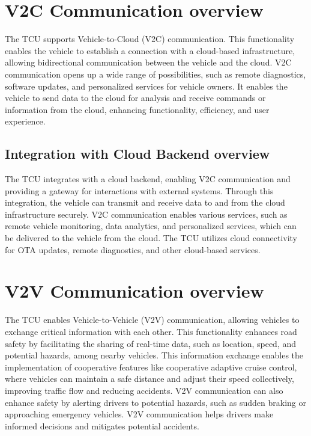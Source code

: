 \documentclass[
12pt,
oneside, 
onehalfspacing, 
nolistspacing, 
parskip, 
chapterinoneline, 
]{AASTCOMPUTER}
\begin{document}
\section{V2C Communication overview}
The TCU supports Vehicle-to-Cloud (V2C) communication. This functionality enables the vehicle to establish a connection with a cloud-based infrastructure, allowing bidirectional communication between the vehicle and the cloud. V2C communication opens up a wide range of possibilities, such as remote diagnostics, software updates, and personalized services for vehicle owners. It enables the vehicle to send data to the cloud for analysis and receive commands or information from the cloud, enhancing functionality, efficiency, and user experience.

\subsection{Integration with Cloud Backend overview}
The TCU integrates with a cloud backend, enabling V2C communication and providing a gateway for interactions with external systems. Through this integration, the vehicle can transmit and receive data to and from the cloud infrastructure securely. V2C communication enables various services, such as remote vehicle monitoring, data analytics, and personalized services, which can be delivered to the vehicle from the cloud. The TCU utilizes cloud connectivity for OTA updates, remote diagnostics, and other cloud-based services.

\section{V2V Communication overview}
The TCU enables Vehicle-to-Vehicle \cite{biswas2006vehicle} (V2V) communication, allowing vehicles to exchange critical information with each other. This functionality enhances road safety by facilitating the sharing of real-time data, such as location, speed, and potential hazards, among nearby vehicles. This information exchange enables the implementation of cooperative features like cooperative adaptive cruise control, where vehicles can maintain a safe distance and adjust their speed collectively, improving traffic flow and reducing accidents. V2V communication can also enhance safety by alerting drivers to potential hazards, such as sudden braking or approaching emergency vehicles. V2V communication helps drivers make informed decisions and mitigates potential accidents.
\end{document}
